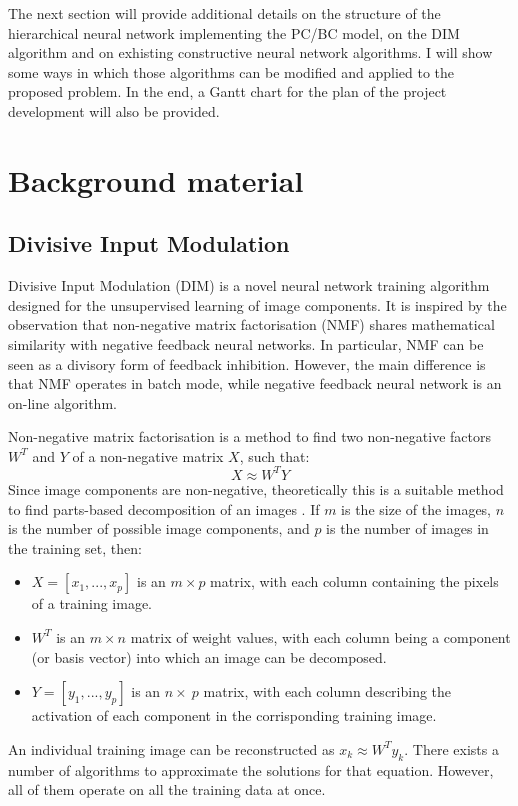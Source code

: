 \documentclass[a4paper,12pt]{article}
\begin{document}
	The next section will provide additional details on the structure of the hierarchical neural network implementing the PC/BC model, on the DIM algorithm and on exhisting constructive neural network algorithms.
	I will show some ways in which those algorithms can be modified and applied to the proposed problem. In the end, a Gantt chart for the plan of the project development will also be provided.

\section{Background material}
	\subsection{Divisive Input Modulation}
		Divisive Input Modulation (DIM) is a novel neural network training algorithm designed for the unsupervised learning of image components.
		It is inspired by the observation that non-negative matrix factorisation (NMF) shares mathematical similarity with negative feedback neural networks.
		In particular, NMF can be seen as a divisory form of feedback inhibition. However, the main difference is that NMF operates in batch mode,
		while negative feedback neural network is an on-line algorithm. \cite{spratling2009unsupervised}
		
		Non-negative matrix factorisation is a method to find two non-negative factors $W^T$ and $Y$ of a non-negative matrix $X$, such that:
		$$X \approx W^T Y$$
		Since image components are non-negative, theoretically this is a suitable method to find parts-based decomposition of an images \cite{spratling2009unsupervised}.
		If $m$ is the size of the images, $n$ is the number of possible image components, and $p$ is the number of images in the training set, then:
		\begin{itemize}
			\item $X = [x_1, ..., x_p]$ is an $m \times p$ matrix, with each column containing the pixels of a training image.
			\item $W^T$ is an $m \times n$ matrix of weight values, with each column being a component (or basis vector) into which an image can be decomposed.
			\item $Y = [y_1, ..., y_p]$ is an $n \times\ p$ matrix, with each column describing the activation of each component in the corrisponding training image.
		\end{itemize}
		An individual training image can be reconstructed as $x_k \approx W^T y_k$. \cite{spratling2009unsupervised}
		There exists a number of algorithms to approximate the solutions for that equation. However, all of them operate on all the training data at once.
		
\end{document}
